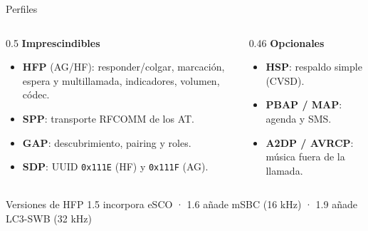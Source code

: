 \documentclass[aspectratio=169,10pt]{beamer}
\begin{document}
\begin{frame}{Perfiles}
  \begin{columns}[T,onlytextwidth]
    \begin{column}{0.5\textwidth}
      \footnotesize
      \textbf{Imprescindibles}
      \begin{itemize}
        \item \textbf{HFP} (AG/HF): responder/colgar, marcación, espera y multillamada, indicadores, volumen, códec.
        \item \textbf{SPP}: transporte RFCOMM de los AT.
        \item \textbf{GAP}: descubrimiento, pairing y roles.
        \item \textbf{SDP}: UUID \texttt{0x111E} (HF) y \texttt{0x111F} (AG).
      \end{itemize}
    \end{column}
    \begin{column}{0.46\textwidth}
      \footnotesize
      \textbf{Opcionales}
      \begin{itemize}
        \item \textbf{HSP}: respaldo simple (CVSD).
        \item \textbf{PBAP / MAP}: agenda y SMS.
        \item \textbf{A2DP / AVRCP}: música fuera de la llamada.
      \end{itemize}
    \end{column}
  \end{columns}
  \vspace{3mm}
  \begin{block}{Versiones de HFP}
    \footnotesize 1.5 incorpora eSCO · 1.6 añade mSBC (16 kHz) · 1.9 añade LC3-SWB (32 kHz)
  \end{block}
\end{frame}
\end{document}
